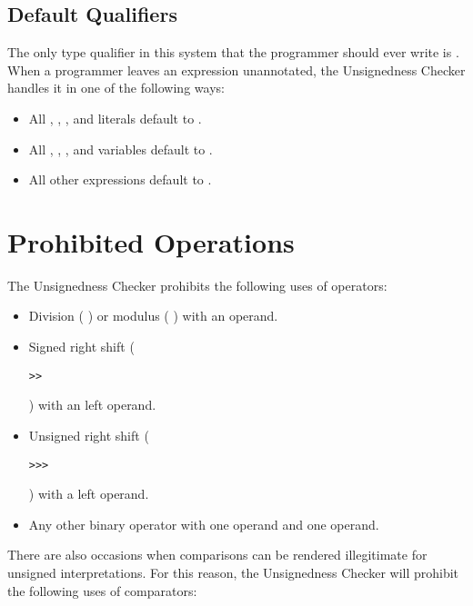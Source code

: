 \subsection{Default Qualifiers\label{unsignedness-checker-annotations-default-qualifiers}}

The only type qualifier in this system that the programmer should ever write is
. When a programmer leaves an expression unannotated, the
Unsignedness Checker handles it in one of the following ways:

\begin{itemize}

    \item
    All , , , and  literals default
    to .
    \item
    All , , , and  variables default
    to .
    \item
    All other expressions default to .

\end{itemize}

\section{Prohibited Operations\label{unsignedness-checker-Prohibited-Operations}}

The Unsignedness Checker prohibits the following uses of operators:

\begin{itemize}

    \item   
    Division ( \code{/} ) or modulus ( \code{\%} ) with an 
    operand.
    \item   
    Signed right shift ( \begin{Verbatim}>>\end{Verbatim} ) with an  left operand.
    \item   
    Unsigned right shift ( \begin{Verbatim}>>>\end{Verbatim} ) with a  left operand.
    \item   
    Any other binary operator with one  operand and one
     operand.

\end{itemize}

There are also occasions when comparisons can be rendered illegitimate for
unsigned interpretations. For this reason, the Unsignedness Checker will prohibit the following uses of comparators:

